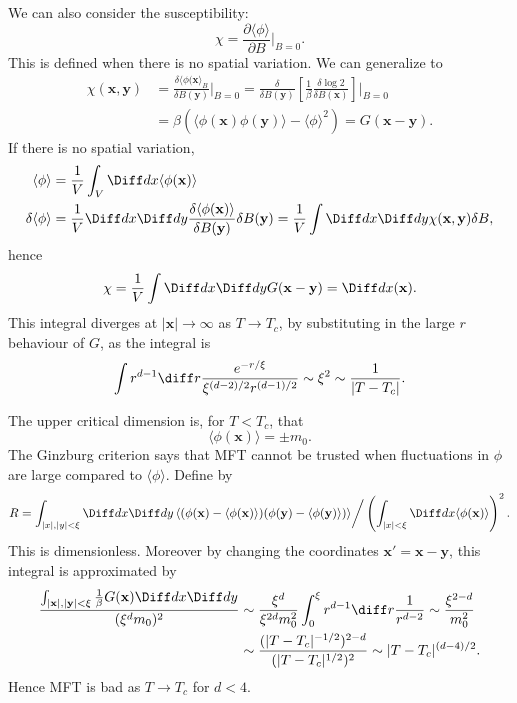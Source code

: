 \documentclass[12pt]{article}
\begin{document}
We can also consider the susceptibility:
\[
\chi = \frac{\partial \langle \phi \rangle}{\partial B} \biggr|_{B = 0}.
\]
This is defined when there is no spatial variation. We can generalize to
\begin{align*}
	\chi(\mathbf{x}, \mathbf{y}) &= \frac{\delta \langle \phi(\mathbf{x} \rangle_B}{\delta B(\mathbf{y})} \biggr|_{B = 0} = \frac{\delta}{\delta B(\mathbf{y})} \left[ \frac{1}{\beta} \frac{\delta \log 2}{\delta B(\mathbf{x})} \right] \biggr|_{B = 0} \\
				     &= \beta(\langle \phi(\mathbf{x}) \phi(\mathbf{y}) \rangle - \langle \phi \rangle^2) = G(\mathbf{x} - \mathbf{y}).
\end{align*}
If there is no spatial variation,
\begin{align*}
	\langle \phi \rangle &= \frac{1}{V} \int_V \Diff d x \langle \phi(\mathbf{x}) \rangle \\
	\delta \langle \phi \rangle &= \frac{1}{V} \Diff d x \Diff d y \frac{\delta \langle \phi(\mathbf{x}) \rangle}{\delta B(\mathbf{y})} \delta B(\mathbf{y}) = \frac{1}{V} \int \Diff d x \Diff d y \chi(\mathbf{x}, \mathbf{y}) \delta B,
\end{align*}
hence
\[
\chi = \frac{1}{V} \int \Diff d x \Diff d y G(\mathbf{x}- \mathbf{y}) = \Diff d x (\mathbf{x}).
\]
This integral diverges at $|\mathbf{x}| \to \infty$ as $T \to T_c$, by substituting in the large $r$ behaviour of $G$, as the integral is
\[
\int r^{d-1} \diff r \frac{e^{-r/\xi}}{\xi^{(d-2)/2} r^{(d-1)/2}} \sim \xi^2 \sim \frac{1}{|T - T_c|}.
\]


The upper critical dimension is, for $T < T_c$, that
\[
\langle \phi(\mathbf{x}) \rangle = \pm m_0.
\]
The Ginzburg criterion says that MFT cannot be trusted when fluctuations in $\phi$ are large compared to $\langle \phi \rangle$. Define by
\[
	R = \int_{|x|, |y| < \xi} \Diff d x \Diff d y \, \langle (\phi(\mathbf{x}) - \langle \phi(\mathbf{x})\rangle) (\phi(\mathbf{y}) - \langle \phi(\mathbf{y})\rangle ) \rangle \bigg/ \left( \int_{|x| < \xi} \Diff d x \langle \phi(\mathbf{x}) \rangle \right)^2.
\]
This is dimensionless. Moreover by changing the coordinates $\mathbf{x}' = \mathbf{x} - \mathbf{y}$, this integral is approximated by
\begin{align*}
	\frac{\int_{|\mathbf{x}|, |\mathbf{y}| < \xi} \frac{1}{\beta} G(\mathbf{x}) \Diff d x \Diff d y}{(\xi^{d} m_0)^2} &\sim \frac{\xi^d}{\xi^{2d} m_0^2} \int_0^{\xi} r^{d-1} \diff r \frac{1}{r^{d-2}} \sim \frac{\xi^{2 - d}}{m_0^2} \\
															  &\sim \frac{(|T - T_c|^{-1/2})^{2-d}}{(|T - T_c|^{1/2})^2} \sim |T - T_c|^{(d-4)/2}.
\end{align*}
Hence MFT is bad as $T \to T_c$ for $d < 4$.
\end{document}
